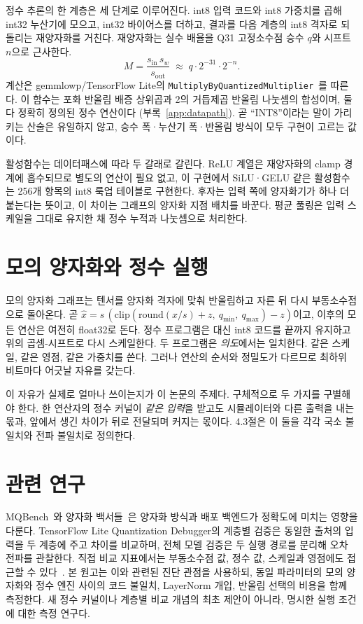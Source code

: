 \documentclass[11pt,a4paper,oneside]{report}
\begin{document}
정수 추론의 한 계층은 세 단계로 이루어진다. int8 입력 코드와 int8 가중치를 곱해 int32 누산기에 모으고,
int32 바이어스를 더하고, 결과를 다음 계층의 int8 격자로 되돌리는 재양자화를 거친다. 재양자화는 실수 배율을
Q31 고정소수점 승수 $q$와 시프트 $n$으로 근사한다.
\[
  M = \frac{s_{\text{in}}\, s_w}{s_{\text{out}}}
    \;\approx\; q \cdot 2^{-31} \cdot 2^{-n}.
\]
계산은 gemmlowp/TensorFlow Lite의 \texttt{MultiplyByQuantized\-Multiplier}~\cite{gemmlowp}를 따른다. 이
함수는 포화 반올림 배증 상위곱과 2의 거듭제곱 반올림 나눗셈의 합성이며, 둘 다 정확히 정의된 정수 연산이다
(부록~\ref{app:datapath}). 곧 ``INT8''이라는 말이 가리키는 산술은 유일하지 않고, 승수 폭·누산기 폭·반올림
방식이 모두 구현이 고르는 값이다.

활성함수는 데이터패스에 따라 두 갈래로 갈린다. ReLU 계열은 재양자화의 clamp 경계에 흡수되므로 별도의
연산이 필요 없고, 이 구현에서 SiLU·GELU 같은 활성함수는 256개 항목의 int8 룩업 테이블로
구현한다. 후자는 입력 쪽에 양자화기가 하나 더 붙는다는 뜻이고, 이 차이는 그래프의 양자화 지점 배치를
바꾼다. 평균 풀링은 입력 스케일을 그대로 유지한 채 정수 누적과 나눗셈으로 처리한다.

\section{모의 양자화와 정수 실행}

모의 양자화 그래프는 텐서를 양자화 격자에 맞춰 반올림하고 자른 뒤 다시 부동소수점으로 돌아온다. 곧
$\hat{x} = s\,(\mathrm{clip}(\mathrm{round}(x/s) + z,\ q_{\min},\ q_{\max}) - z)$이고, 이후의 모든 연산은
여전히 float32로 돈다. 정수 프로그램은 대신 int8 코드를 끝까지 유지하고 위의 곱셈-시프트로 다시
스케일한다. 두 프로그램은 \emph{의도}에서는 일치한다. 같은 스케일, 같은 영점, 같은 가중치를 쓴다. 그러나
연산의 순서와 정밀도가 다르므로 최하위 비트마다 어긋날 자유를 갖는다.

이 자유가 실제로 얼마나 쓰이는지가 이 논문의 주제다. 구체적으로 두 가지를 구별해야 한다. 한 연산자의
정수 커널이 \emph{같은 입력}을 받고도 시뮬레이터와 다른 출력을 내는 몫과, 앞에서 생긴 차이가 뒤로
전달되며 커지는 몫이다. 4.3절은 이 둘을 각각 국소 불일치와 전파 불일치로 정의한다.

\section{관련 연구}

MQBench~\cite{mqbench}와 양자화 백서들~\cite{nagel2021,krishnamoorthi2018}은 양자화 방식과
배포 백엔드가 정확도에 미치는 영향을 다룬다. TensorFlow Lite Quantization Debugger의 계층별 검증은
동일한 출처의 입력을 두 계층에 주고 차이를 비교하며, 전체 모델 검증은 두 실행 경로를 분리해
오차 전파를 관찰한다. 직접 비교 지표에서는 부동소수점 값, 정수 값, 스케일과 영점에도 접근할 수
있다~\cite{quantdebug}. 본 원고는 이와 관련된 진단 관점을 사용하되, 동일 파라미터의 모의 양자화와
정수 엔진 사이의 코드 불일치, LayerNorm 개입, 반올림 선택의 비용을 함께 측정한다.
새 정수 커널이나 계층별 비교 개념의 최초 제안이 아니라, 명시한 실행 조건에 대한 측정 연구다.
\end{document}
